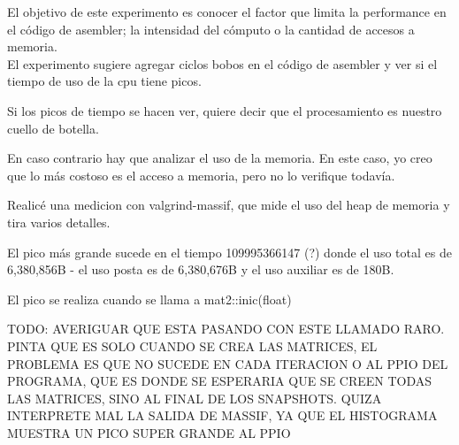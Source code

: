 El objetivo de este experimento es conocer el factor que limita la performance en el código de asembler; la intensidad del cómputo o la cantidad de accesos a memoria.\\
El experimento sugiere agregar ciclos bobos en el código de asembler y ver si el tiempo de uso de la cpu tiene picos.







Si los picos de tiempo se hacen ver, quiere decir que el procesamiento es nuestro cuello de botella.

En caso contrario hay que analizar el uso de la memoria.
En este caso, yo creo que lo más costoso es el acceso a memoria, pero no lo verifique todavía.

Realicé una medicion con valgrind-massif, que mide el uso del heap de memoria y tira varios detalles.

El pico más grande sucede en el tiempo 109995366147 (?) donde el uso total es de 6,380,856B - el uso posta es de 6,380,676B y el uso auxiliar es de 180B.

El pico se realiza cuando se llama a mat2::inic(float)

TODO: AVERIGUAR QUE ESTA PASANDO CON ESTE LLAMADO RARO. PINTA QUE ES SOLO CUANDO SE CREA LAS MATRICES, EL PROBLEMA ES QUE NO SUCEDE EN CADA ITERACION O AL PPIO DEL PROGRAMA, QUE ES DONDE SE ESPERARIA QUE SE CREEN TODAS LAS MATRICES, SINO AL FINAL DE LOS SNAPSHOTS. QUIZA INTERPRETE MAL LA SALIDA DE MASSIF, YA QUE EL HISTOGRAMA MUESTRA UN PICO SUPER GRANDE AL PPIO
